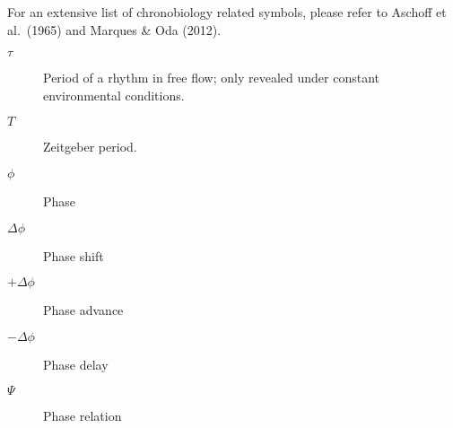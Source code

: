 
\begin{simbolos}
For an extensive list of chronobiology related symbols, please refer to
Aschoff et al.~(1965) and Marques \& Oda (2012).

\begin{description}
\item[\(\tau\)]
\hspace{20cm}

Period of a rhythm in free flow; only revealed under constant
environmental conditions.
\item[\(T\)]
\hspace{20cm}

Zeitgeber period.
\item[\(\phi\)]
\hspace{20cm}

Phase
\item[\(\Delta\phi\)]
\hspace{20cm}

Phase shift
\item[\(+\Delta\phi\)]
\hspace{20cm}

Phase advance
\item[\(-\Delta\phi\)]
\hspace{20cm}

Phase delay
\item[\(\Psi\)]
\hspace{20cm}

Phase relation
\end{description}
\end{simbolos}


